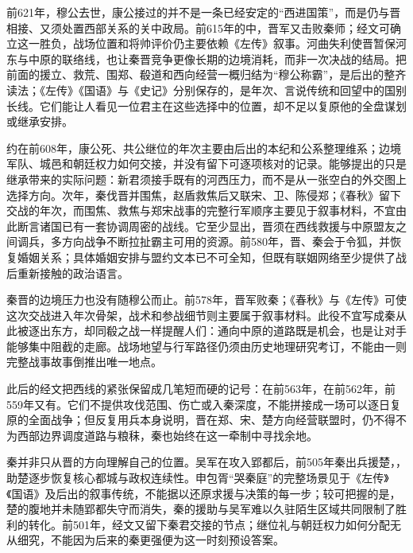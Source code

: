 前621年，穆公去世，康公接过的并不是一条已经安定的“西进国策”，而是仍与晋相接、又须处置西部关系的关中政局。前615年的中，晋军又击败秦师；经文可确立这一胜负，战场位置和将帅评价仍主要依赖《左传》叙事。河曲失利使晋暂保河东与中原的联络线，也让秦晋竞争更像长期的边境消耗，而非一次决战的结局。把前面的援立、救荒、围郑、殽道和西向经营一概归结为“穆公称霸”，是后出的整齐读法；《左传》《国语》与《史记》分别保存的，是年次、言说传统和回望中的国别长线。它们能让人看见一位君主在这些选择中的位置，却不足以复原他的全盘谋划或继承安排。

约在前608年，康公死、共公继位的年次主要由后出的本纪和公系整理维系；边境军队、城邑和朝廷权力如何交接，并没有留下可逐项核对的记录。能够提出的只是继承带来的实际问题：新君须接手既有的河西压力，而不是从一张空白的外交图上选择方向。次年，秦伐晋并围焦，赵盾救焦后又联宋、卫、陈侵郑；《春秋》留下交战的年次，而围焦、救焦与郑宋战事的完整行军顺序主要见于叙事材料，不宜由此断言诸国已有一套协调周密的战线。它至少显出，晋须在西线救援与中原盟友之间调兵，多方向战争不断拉扯霸主可用的资源。前580年，晋、秦会于令狐，并恢复婚姻关系；具体婚姻安排与盟约文本已不可全知，但既有联姻网络至少提供了战后重新接触的政治语言。

秦晋的边境压力也没有随穆公而止。前578年，晋军败秦；《春秋》与《左传》可使这次交战进入年次骨架，战术和参战细节则主要属于叙事材料。此役不宜写成秦从此被逐出东方，却同殽之战一样提醒人们：通向中原的道路既是机会，也是让对手能够集中阻截的走廊。战场地望与行军路径仍须由历史地理研究考订，不能由一则完整战事故事倒推出唯一地点。

此后的经文把西线的紧张保留成几笔短而硬的记号：在前563年，在前562年，前559年又有。它们不提供攻伐范围、伤亡或入秦深度，不能拼接成一场可以逐日复原的全面战争；但反复用兵本身说明，晋在郑、宋、楚方向经营联盟时，仍不得不为西部边界调度道路与粮秣，秦也始终在这一牵制中寻找余地。

秦并非只从晋的方向理解自己的位置。吴军在攻入郢都后，前505年秦出兵援楚，，助楚逐步恢复核心都城与政权连续性。申包胥“哭秦庭”的完整场景见于《左传》《国语》及后出的叙事传统，不能据以还原求援与决策的每一步；较可把握的是，楚的腹地并未随郢都失守而消失，秦的援助与吴军难以久驻陌生区域共同限制了胜利的转化。前501年，经文又留下秦君交接的节点；继位礼与朝廷权力如何分配无从细究，不能因为后来的秦更强便为这一时刻预设答案。

